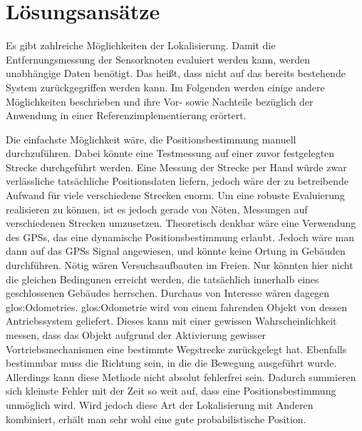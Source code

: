 \section{Lösungsansätze}
\label{sec:loesungsansaetze}

Es gibt zahlreiche Möglichkeiten der Lokalisierung. Damit die Entfernungsmessung der Sensorknoten evaluiert werden kann, werden unabhängige Daten benötigt. Das heißt, dass nicht auf das bereits bestehende System zurückgegriffen werden kann. Im Folgenden werden einige andere Möglichkeiten beschrieben und ihre Vor- sowie Nachteile bezüglich der Anwendung in einer Referenzimplementierung erörtert. 

Die einfachste Möglichkeit wäre, die Positionsbestimmung manuell durchzuführen. Dabei könnte eine Testmessung auf einer zuvor festgelegten Strecke durchgeführt werden. Eine Messung der Strecke per Hand würde zwar verlässliche tatsächliche Positionsdaten liefern, jedoch wäre der zu betreibende Aufwand für viele verschiedene Strecken enorm.
Um eine robuste Evaluierung realisieren zu können, ist es jedoch gerade von Nöten, Messungen auf verschiedenen Strecken umzusetzen.
Theoretisch denkbar wäre eine Verwendung des \glspl{GPS}, das eine dynamische Positionsbestimmung erlaubt. Jedoch wäre man dann auf das \glspl{GPS} Signal angewiesen, und könnte keine Ortung in Gebäuden durchführen. Nötig wären Versuchsaufbauten im Freien. Nur könnten hier nicht die gleichen Bedingunen erreicht werden, die tatsächlich innerhalb eines geschlossenen Gebäudes herrschen.
Durchaus von Interesse wären dagegen \glspl{glos:Odometrie}. \gls{glos:Odometrie} wird von einem fahrenden Objekt von dessen Antriebssystem geliefert. Dieses kann mit einer gewissen Wahrscheinlichkeit messen, dass das Objekt aufgrund der Aktivierung gewisser Vortriebsmechanismen eine bestimmte Wegstrecke zurückgelegt hat. Ebenfalls bestimmbar muss die Richtung sein, in die die Bewegung ausgeführt wurde. Allerdings kann diese Methode nicht absolut fehlerfrei sein. Dadurch summieren sich kleinste Fehler mit der Zeit so weit auf, dass eine Positionsbestimmung unmöglich wird.
Wird jedoch diese Art der Lokalisierung mit Anderen kombiniert, erhält man sehr wohl eine gute probabilistische Position.

